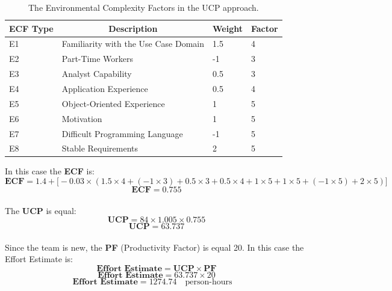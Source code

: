 \documentclass[12pt]{article}
\begin{document}
\begin{table}[h]
\centering
\caption{The Environmental Complexity Factors in the UCP approach.}
\begin{tabular}{|l|l|l|l|}
\hline
\multicolumn{1}{|c|}{\textbf{ECF Type}} & \multicolumn{1}{c|}{\textbf{Description}} & \multicolumn{1}{c|}{\textbf{Weight}} & \multicolumn{1}{c|}{\textbf{Factor}} \\ \hline
E1 & Familiarity with the Use Case Domain & 1.5 & 4 \\ \hline
E2 & Part-Time Workers & -1 & 3 \\ \hline
E3 & Analyst Capability & 0.5 & 3 \\ \hline
E4 & Application Experience & 0.5 & 4 \\ \hline
E5 & Object-Oriented Experience & 1 & 5 \\ \hline
E6 & Motivation & 1 & 5 \\ \hline
E7 & Difficult Programming Language & -1 & 5 \\ \hline
E8 & Stable Requirements & 2 & 5 \\ \hline
\end{tabular}
\end{table}

In this case the \textbf{ECF} is:
\begin{equation}
    \textbf{ECF} =  1.4 + \Big[-0.03 \times(1.5\times4+(-1\times3)+0.5\times3+0.5\times4+1\times5+1\times5+(-1\times5)+2\times5)\Big]
\end{equation}
\begin{equation}
    \textbf{ECF} =  0.755
\end{equation}\\

The \textbf{UCP} is equal:
\begin{equation}
    \textbf{UCP} = 84 \times 1.005 \times 0.755
\end{equation}
\begin{equation}
    \textbf{UCP} = 63.737
\end{equation}\\

Since the team is new, the \textbf{PF} (Productivity Factor) is equal 20.
In this case the Effort Estimate is:
\begin{equation}
    \textbf{Effort Estimate} = \textbf{UCP} \times \textbf{PF}
\end{equation}
\begin{equation}
    \textbf{Effort Estimate} = 63.737 \times 20
\end{equation}
\begin{equation}
    \textbf{Effort Estimate} = 1274.74 \quad \textrm{person-hours} \quad
\end{equation}\\
\end{document}
